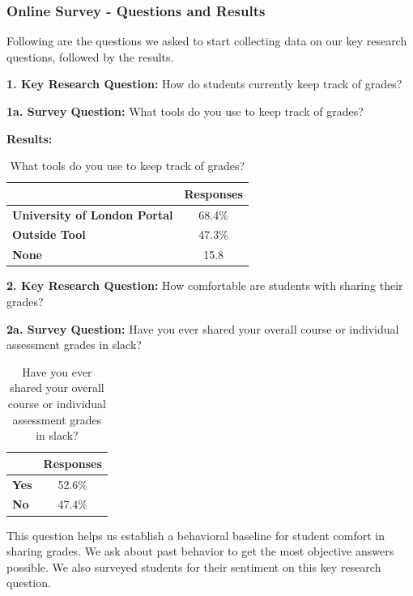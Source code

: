 \subsubsection{Online Survey - Questions and Results}
Following are the questions we asked to start collecting data on our key research questions, followed by the results.

\textbf{1. Key Research Question:} How do students currently keep track of grades?
\smallskip

\textbf{1a. Survey Question:} What tools do you use to keep track of grades?
\smallskip

\textbf{Results:}

\begin{table}[H]
\centering
\begin{tabular}{@{}lc@{}}
\toprule
                  & {\textbf{Responses}}  \\ \midrule
\textbf{University of London Portal}    & 68.4\%    \\
\textbf{Outside Tool}                   & 47.3\%    \\
\textbf{None}                           & 15.8      \\ \bottomrule
\end{tabular}
\caption{What tools do you use to keep track of grades?}
\label{survey1a}
\end{table}

\textbf{2. Key Research Question:} How comfortable are students with sharing their grades?
\smallskip

\textbf{2a. Survey Question:} Have you ever shared your overall course or individual assessment grades in slack?
\smallskip

\begin{table}[H]
\centering
\begin{tabular}{@{}lc@{}}
\toprule
                  & {\textbf{Responses}}  \\ \midrule
\textbf{Yes}    & 52.6\%    \\
\textbf{No}     & 47.4\%    \\ \bottomrule
\end{tabular}
\caption{Have you ever shared your overall course or individual assessment grades in slack?}
\label{survey2a}
\end{table}

This question helps us establish a behavioral baseline for student comfort in sharing grades. We ask about past behavior to get the most objective answers possible. We also surveyed students for their sentiment on this key research question.
\medskip

